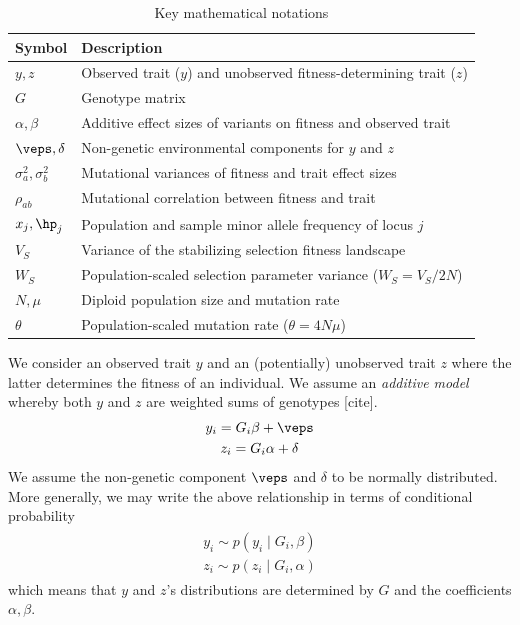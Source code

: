 \begin{table}[htpb]
    \centering
    \caption{Key mathematical notations}
    \label{tab:notation}
    \vspace{0.5em}
    \begin{tabular}{ll}
        \hline
        Symbol & Description \\
        \hline
        $y, z$ & Observed trait ($y$) and unobserved fitness-determining trait ($z$) \\
        $G$ & Genotype matrix \\
        $\alpha, \beta$ & Additive effect sizes of variants on fitness and observed trait \\
        $\veps, \delta$ & Non-genetic environmental components for $y$ and $z$ \\
        $\sigma_a^2, \sigma_b^2$ & Mutational variances of fitness and trait effect sizes \\
        $\rho_{ab}$ & Mutational correlation between fitness and trait \\
        $x_j, \hp_j$ & Population and sample minor allele frequency of locus $j$ \\
        $V_S$ & Variance of the stabilizing selection fitness landscape \\
        $W_S$ & Population-scaled selection parameter variance ($W_S = V_S / 2N$) \\
        $N, \mu$ & Diploid population size and mutation rate \\
        $\theta$ & Population-scaled mutation rate ($\theta = 4N\mu$) \\
        \hline
    \end{tabular}
\end{table}
We consider an observed trait $y$ and an (potentially) unobserved trait $z$ where the latter determines the fitness of an individual.
We assume an \emph{additive model} whereby both $y$ and $z$ are weighted sums of genotypes [cite].
\begin{gather}
    \begin{gathered}
        y_i = G_i\beta + \veps \\
        z_i = G_i\alpha + \delta
    \end{gathered}
\end{gather}
We assume the non-genetic component $\veps$ and $\delta$ to be normally distributed.
More generally, we may write the above relationship in terms of conditional probability
\begin{gather} \label{eq:trait_and_fitness}
    \begin{gathered}
        y_i \sim p(y_i \mid G_i, \beta) \\
        z_i \sim p(z_i \mid G_i, \alpha)
    \end{gathered}
\end{gather}
which means that $y$ and $z$'s distributions are determined by $G$ and the coefficients $\alpha, \beta$.


